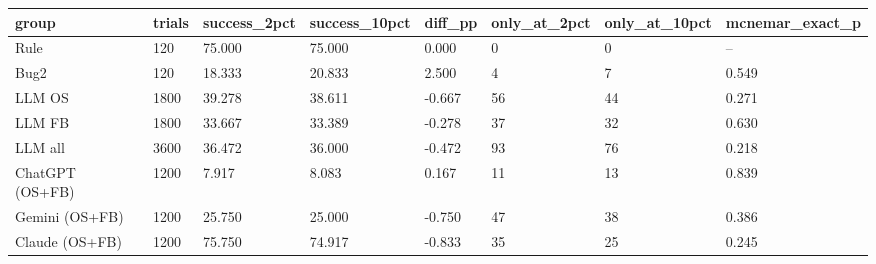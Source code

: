 \begin{tabular}{llllllll}
\hline
group & trials & success\_2pct & success\_10pct & diff\_pp & only\_at\_2pct & only\_at\_10pct & mcnemar\_exact\_p \\
\hline
Rule & 120 & 75.000 & 75.000 & 0.000 & 0 & 0 & -- \\
Bug2 & 120 & 18.333 & 20.833 & 2.500 & 4 & 7 & 0.549 \\
LLM OS & 1800 & 39.278 & 38.611 & -0.667 & 56 & 44 & 0.271 \\
LLM FB & 1800 & 33.667 & 33.389 & -0.278 & 37 & 32 & 0.630 \\
LLM all & 3600 & 36.472 & 36.000 & -0.472 & 93 & 76 & 0.218 \\
ChatGPT (OS+FB) & 1200 & 7.917 & 8.083 & 0.167 & 11 & 13 & 0.839 \\
Gemini (OS+FB) & 1200 & 25.750 & 25.000 & -0.750 & 47 & 38 & 0.386 \\
Claude (OS+FB) & 1200 & 75.750 & 74.917 & -0.833 & 35 & 25 & 0.245 \\
\hline
\end{tabular}
